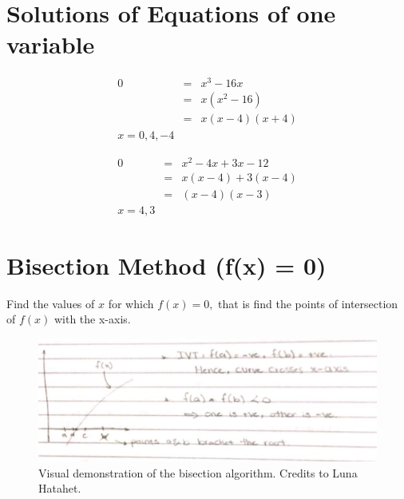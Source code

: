 \documentclass[]{article}
\begin{document}
\section*{Solutions of Equations of one variable}

\begin{eqnarray}
	0 &=& x^3 - 16x \nonumber \\
	&=& x(x^2 - 16) \nonumber\\
	&=& x(x-4)(x+4) \nonumber\\
	 x = 0,4,-4 \nonumber
\end{eqnarray}

\begin{eqnarray}
	0 &=&  x^2 - 4x + 3x - 12 \nonumber \\ 
	&=& x(x-4) + 3(x-4) \nonumber \\
	&=& (x-4)(x-3) \nonumber \\
	x = 4,3 \nonumber
\end{eqnarray}

\section*{Bisection Method (f(x) = 0)}

Find the values of $ x $ for which $ f(x) = 0, $ that is find the points of intersection of $ f(x) $ with the x-axis. 

\begin{figure}
	\centering
	\includegraphics[width=\linewidth]{graph.jpeg}
	\caption{Visual demonstration of the bisection algorithm. Credits to Luna Hatahet. }
	\label{fig:graph}
\end{figure}
\end{document}
